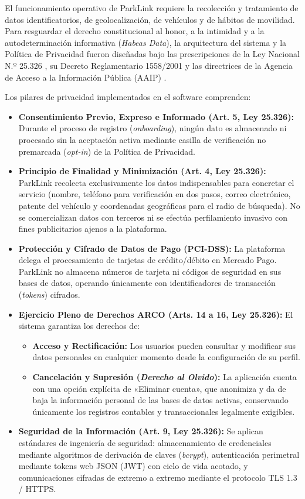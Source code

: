 El funcionamiento operativo de ParkLink requiere la recolección y tratamiento de datos identificatorios, de geolocalización, de vehículos y de hábitos de movilidad. Para resguardar el derecho constitucional al honor, a la intimidad y a la autodeterminación informativa (\textit{Habeas Data}), la arquitectura del sistema y la Política de Privacidad fueron diseñadas bajo las prescripciones de la Ley Nacional N.º 25.326 \autocite{ley25326}, su Decreto Reglamentario 1558/2001 y las directrices de la Agencia de Acceso a la Información Pública (AAIP) \autocite{aaip_normativa}.

Los pilares de privacidad implementados en el software comprenden:

\begin{itemize}
    \item \textbf{Consentimiento Previo, Expreso e Informado (Art. 5, Ley 25.326):} Durante el proceso de registro (\textit{onboarding}), ningún dato es almacenado ni procesado sin la aceptación activa mediante casilla de verificación no premarcada (\textit{opt-in}) de la Política de Privacidad.
    \item \textbf{Principio de Finalidad y Minimización (Art. 4, Ley 25.326):} ParkLink recolecta exclusivamente los datos indispensables para concretar el servicio (nombre, teléfono para verificación en dos pasos, correo electrónico, patente del vehículo y coordenadas geográficas para el radio de búsqueda). No se comercializan datos con terceros ni se efectúa perfilamiento invasivo con fines publicitarios ajenos a la plataforma.
    \item \textbf{Protección y Cifrado de Datos de Pago (PCI-DSS):} La plataforma delega el procesamiento de tarjetas de crédito/débito en Mercado Pago. ParkLink no almacena números de tarjeta ni códigos de seguridad en sus bases de datos, operando únicamente con identificadores de transacción (\textit{tokens}) cifrados.
    \item \textbf{Ejercicio Pleno de Derechos ARCO (Arts. 14 a 16, Ley 25.326):} El sistema garantiza los derechos de:
    \begin{itemize}
        \item \textbf{Acceso y Rectificación:} Los usuarios pueden consultar y modificar sus datos personales en cualquier momento desde la configuración de su perfil.
        \item \textbf{Cancelación y Supresión (\textit{Derecho al Olvido}):} La aplicación cuenta con una opción explícita de «Eliminar cuenta», que anonimiza y da de baja la información personal de las bases de datos activas, conservando únicamente los registros contables y transaccionales legalmente exigibles.
    \end{itemize}
    \item \textbf{Seguridad de la Información (Art. 9, Ley 25.326):} Se aplican estándares de ingeniería de seguridad: almacenamiento de credenciales mediante algoritmos de derivación de claves (\textit{bcrypt}), autenticación perimetral mediante tokens web JSON (JWT) con ciclo de vida acotado, y comunicaciones cifradas de extremo a extremo mediante el protocolo TLS 1.3 / HTTPS.
\end{itemize}

